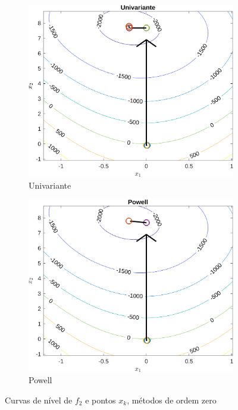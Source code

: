 \documentclass[10pt, a4paper]{article}
\begin{document}
\begin{figure}[H]
      \centering
      \begin{subfigure}{0.45\textwidth}
            \includegraphics[width=\textwidth]{img02_m01.png}
            \caption{Univariante}
            \label{fig:graf02_m01}
      \end{subfigure}
      \begin{subfigure}{0.45\textwidth}
            \centering
            \includegraphics[width=\textwidth]{img02_m02.png}
            \caption{Powell}
            \label{fig:graf02_m02}
      \end{subfigure}
      \caption{Curvas de n\'ivel de $f_{2}$ e pontos $x_{k}$, m\'etodos de ordem zero}
      \label{fig:graf02_ordem0}
\end{figure}
\end{document}
